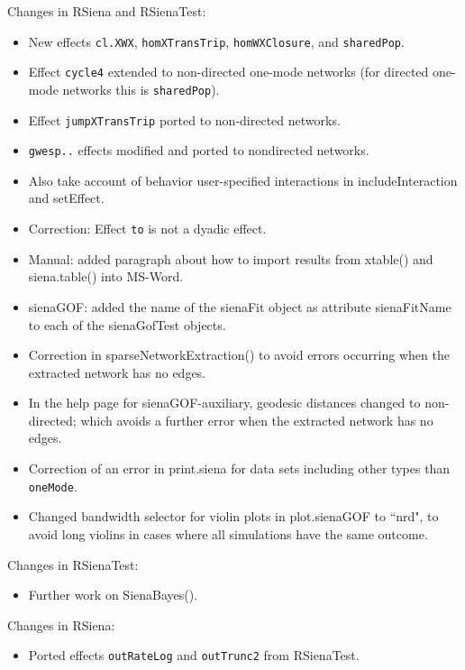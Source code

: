 \documentclass[a4paper,fleqn,11pt]{article}
\newcommand{\+}{\, + \,}
\newcommand{\sfn}[1]{\textsf{#1}}
\begin{document}
{\begin{small}
\begin{itemize}
Changes in RSiena and RSienaTest:
\begin{itemize}
\item New effects \texttt{cl.XWX}, \texttt{homXTransTrip},
    \texttt{homWXClosure}, and \texttt{sharedPop}.
 \item Effect \texttt{cycle4} extended to non-directed one-mode networks
    (for directed one-mode networks this is \texttt{sharedPop}).
 \item Effect \texttt{jumpXTransTrip} ported to non-directed networks.
 \item \texttt{gwesp..}  effects modified and ported to nondirected networks.
 \item Also take account of behavior user-specified interactions in
     \sfn{includeInteraction} and \sfn{setEffect}.
 \item Correction: Effect \texttt{to} is not a dyadic effect.
 \item Manual: added paragraph about how to import results from
     \sfn{xtable()} and \sfn{siena.table()} into MS-Word.
 \item \sfn{sienaGOF}: added the name of the \sfn{sienaFit} object
     as attribute \sfn{sienaFitName} to each of the \sfn{sienaGofTest} objects.
 \item Correction in \sfn{sparseNetworkExtraction()} to avoid errors occurring
     when the extracted network has no edges.
 \item In the help page for \sfn{sienaGOF-auxiliary}, geodesic distances
     changed to non-directed; which avoids a further error
     when the extracted network has no edges.
 \item Correction of an error in \sfn{print.siena} for data sets including
     other types than \texttt{oneMode}.
 \item Changed bandwidth selector for violin plots in \sfn{plot.sienaGOF} to ``nrd",
     to avoid long violins in cases where all simulations have the same outcome.
\end{itemize}

Changes in RSienaTest:
\begin{itemize}
\item Further work on \sfn{SienaBayes()}.
\end{itemize}

Changes in RSiena:
\begin{itemize}
  \item Ported effects \texttt{outRateLog} and \texttt{outTrunc2} from RSienaTest.
\end{itemize}


\end{itemize}
\end{small}}
\end{document}

